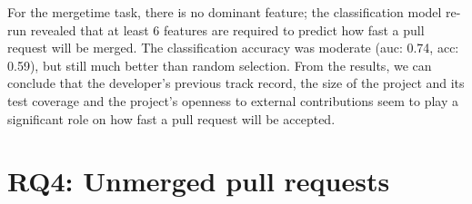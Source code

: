\documentclass{sig-alternate}
\begin{document}

For the \textsf{mergetime} task, there is no dominant feature; the
classification model re-run revealed that at least 6 features are required to
predict how fast a pull request will be merged. The classification accuracy was
moderate ({\sc auc:} 0.74, {\sc acc}: 0.59), but still much better than random
selection. From the results, we can conclude that the developer's previous
track record, the size of the project and its test coverage and the project's
openness to external contributions seem to play a significant role on
how fast a pull request will be accepted.


\section{RQ4: Unmerged pull requests}
\end{document}
